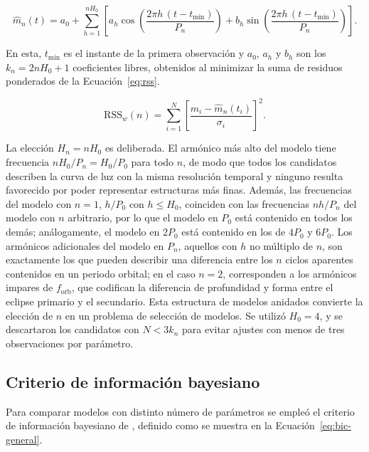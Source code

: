 \documentclass[12pt,letterpaper,oneside]{book}
\begin{document}
\begin{equation}
	\hat m_n(t) = a_0 + \sum_{h=1}^{nH_0}\left[ a_h\cos\left(\frac{2\pi h\,(t-t_{\mathrm{min}})}{P_n}\right) + b_h\sin\left(\frac{2\pi h\,(t-t_{\mathrm{min}})}{P_n}\right) \right].
	\label{eq:fourier-candidato}
\end{equation}

En esta, $t_{\mathrm{min}}$ es el instante de la primera observaci\'on y $a_0$, $a_h$ y $b_h$ son los $k_n=2nH_0+1$ coeficientes libres, obtenidos al minimizar la suma de residuos ponderados de la Ecuaci\'on~\eqref{eq:rss}.

\begin{equation}
	\mathrm{RSS}_w(n) = \sum_{i=1}^{N} \left[ \frac{m_i - \hat m_n(t_i)}{\sigma_i} \right]^2.
	\label{eq:rss}
\end{equation}

La elecci\'on $H_n=nH_0$ es deliberada. El arm\'onico m\'as alto del modelo tiene frecuencia $nH_0/P_n=H_0/P_0$ para todo $n$, de modo que todos los candidatos describen la curva de luz con la misma resoluci\'on temporal y ninguno resulta favorecido por poder representar estructuras m\'as finas. Adem\'as, las frecuencias del modelo con $n=1$, $h/P_0$ con $h\leq H_0$, coinciden con las frecuencias $nh/P_n$ del modelo con $n$ arbitrario, por lo que el modelo en $P_0$ est\'a contenido en todos los dem\'as; an\'alogamente, el modelo en $2P_0$ est\'a contenido en los de $4P_0$ y $6P_0$. Los arm\'onicos adicionales del modelo en $P_n$, aquellos con $h$ no m\'ultiplo de $n$, son exactamente los que pueden describir una diferencia entre los $n$ ciclos aparentes contenidos en un periodo orbital; en el caso $n=2$, corresponden a los arm\'onicos impares de $f_{\mathrm{orb}}$, que codifican la diferencia de profundidad y forma entre el eclipse primario y el secundario. Esta estructura de modelos anidados convierte la elecci\'on de $n$ en un problema de selecci\'on de modelos. Se utiliz\'o $H_0=4$, y se descartaron los candidatos con $N<3k_n$ para evitar ajustes con menos de tres observaciones por par\'ametro.

\subsection{Criterio de informaci\'on bayesiano}

Para comparar modelos con distinto n\'umero de par\'ametros se emple\'o el criterio de informaci\'on bayesiano de \citet{Schwarz1978}, definido como se muestra en la Ecuaci\'on~\eqref{eq:bic-general}.
\end{document}

